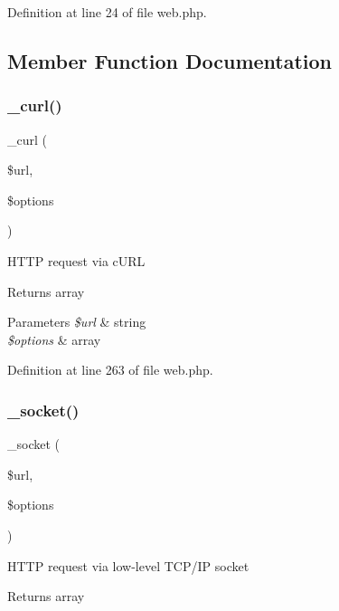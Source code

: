 Definition at line 24 of file web.\+php.



\subsection{Member Function Documentation}
\hypertarget{class_web_ace30d15b8ca06a3f846ccf20fc111beb}{}\label{class_web_ace30d15b8ca06a3f846ccf20fc111beb} 
\subsubsection{\texorpdfstring{\+\_\+curl()}{\_curl()}}
{\footnotesize\ttfamily \+\_\+curl (\begin{DoxyParamCaption}\item[{}]{\$url,  }\item[{}]{\$options }\end{DoxyParamCaption})\hspace{0.3cm}{\ttfamily [protected]}}

H\+T\+TP request via c\+U\+RL \begin{DoxyReturn}{Returns}
array 
\end{DoxyReturn}

\begin{DoxyParams}{Parameters}
{\em \$url} & string \\
\hline
{\em \$options} & array \\
\hline
\end{DoxyParams}


Definition at line 263 of file web.\+php.

\hypertarget{class_web_a9896cd454933a7743510844bd268b548}{}\label{class_web_a9896cd454933a7743510844bd268b548} 
\subsubsection{\texorpdfstring{\+\_\+socket()}{\_socket()}}
{\footnotesize\ttfamily \+\_\+socket (\begin{DoxyParamCaption}\item[{}]{\$url,  }\item[{}]{\$options }\end{DoxyParamCaption})\hspace{0.3cm}{\ttfamily [protected]}}

H\+T\+TP request via low-\/level T\+C\+P/\+IP socket \begin{DoxyReturn}{Returns}
array 
\end{DoxyReturn}

